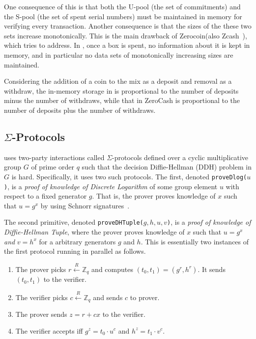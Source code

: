 \documentclass[runningheads]{llncs}
\newcommand{\zerocoin}{Zerocoin\xspace}
\begin{document}
One consequence of this is that both the U-pool (the set of commitments) and the S-pool (the set of spent serial numbers) must be maintained in memory for verifying every transaction. 
Another consequence is that the sizes of the these two sets increase monotonically. 
This is the main drawback of \zerocoin (also Zcash~\cite{zcash}), which \algname tries to address. 
In \algname, once a box is spent, no information about it is kept in memory, and in particular no data sets of monotonically increasing sizes are maintained. 

Considering the addition of a coin to the mix as a deposit and removal as a withdraw, the in-memory storage in \algname is proportional to the number of deposits minus the number of withdraws, while that in ZeroCash is proportional to the number of deposits plus the number of withdraws.  

\subsection{$\Sigma$-Protocols} 

\algname uses two-party interactions called $\Sigma$-protocols defined over a cyclic multiplicative group $G$ of prime order $q$ such that the decision Diffie-Hellman (DDH) problem in $G$ is hard. Specifically, it uses two such protocols. The first, denoted \texttt{proveDlog($u$)}, is a {\em proof of knowledge of Discrete Logarithm} of some group element $u$ with respect to a fixed generator $g$. That is, the prover proves knowledge of $x$ such that $u = g^x$ by using Schnorr signatures~\cite{Sch91}. 

The second primitive, denoted \texttt{proveDHTuple($g, h, u, v$)}, is a {\em proof of knowledge of Diffie-Hellman Tuple}, where the prover proves knowledge of $x$ such that $u = g^x$ {\em and} $v = h^x$ for a arbitrary generators $g$ and $h$. This is essentially two instances of the first protocol running in parallel as follows.

\begin{enumerate}
	\item The prover picks $r \stackrel{R}{\leftarrow} \mathbb{Z}_q$ and computes $(t_0, t_1) = ({g}^r, {h}^r)$. It sends $(t_0, t_1)$ to the verifier.
	\item The verifier picks $c \stackrel{R}{\leftarrow} \mathbb{Z}_q$ and sends $c$ to prover.
	\item The prover sends $z = r + cx$ to the verifier. 
	\item The verifier accepts iff ${g}^z = {t_0}\cdot {u}^c$ and $h^z=t_1\cdot v^c$.
\end{enumerate}
\end{document}

